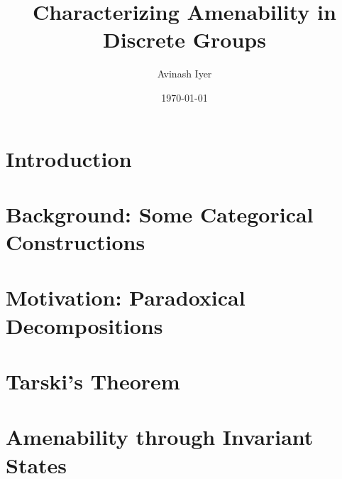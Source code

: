 \documentclass[10pt]{package2}
\title{Characterizing Amenability in Discrete Groups}
\author{Avinash Iyer}
\date{\today}
\newcommand{\1}{\mathds{1}}
\begin{document}
\maketitle
\RaggedRight
\tableofcontents
\chapter{Introduction}
%
\chapter{Background: Some Categorical Constructions}

\chapter{Motivation: Paradoxical Decompositions}

\chapter{Tarski's Theorem}

\chapter{Amenability through Invariant States}

\end{document}
